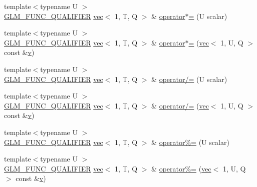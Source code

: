 \begin{DoxyCompactItemize}
\item 
{\footnotesize template$<$typename U $>$ }\\\hyperlink{setup_8hpp_a33fdea6f91c5f834105f7415e2a64407}{G\+L\+M\+\_\+\+F\+U\+N\+C\+\_\+\+Q\+U\+A\+L\+I\+F\+I\+ER} \hyperlink{structglm_1_1vec}{vec}$<$ 1, T, Q $>$ \& \hyperlink{structglm_1_1vec_3_011_00_01_t_00_01_q_01_4_a40577d349a0b2aa9cb5e8f516be56f5b}{operator$\ast$=} (U scalar)
\item 
{\footnotesize template$<$typename U $>$ }\\\hyperlink{setup_8hpp_a33fdea6f91c5f834105f7415e2a64407}{G\+L\+M\+\_\+\+F\+U\+N\+C\+\_\+\+Q\+U\+A\+L\+I\+F\+I\+ER} \hyperlink{structglm_1_1vec}{vec}$<$ 1, T, Q $>$ \& \hyperlink{structglm_1_1vec_3_011_00_01_t_00_01_q_01_4_ad99d855b46377ab71a047c3c62c41054}{operator$\ast$=} (\hyperlink{structglm_1_1vec}{vec}$<$ 1, U, Q $>$ const \&\hyperlink{_s_d_l__opengl_8h_a10a82eabcb59d2fcd74acee063775f90}{v})
\item 
{\footnotesize template$<$typename U $>$ }\\\hyperlink{setup_8hpp_a33fdea6f91c5f834105f7415e2a64407}{G\+L\+M\+\_\+\+F\+U\+N\+C\+\_\+\+Q\+U\+A\+L\+I\+F\+I\+ER} \hyperlink{structglm_1_1vec}{vec}$<$ 1, T, Q $>$ \& \hyperlink{structglm_1_1vec_3_011_00_01_t_00_01_q_01_4_a25bbfeb0e44bca9205cd7b127b566ba8}{operator/=} (U scalar)
\item 
{\footnotesize template$<$typename U $>$ }\\\hyperlink{setup_8hpp_a33fdea6f91c5f834105f7415e2a64407}{G\+L\+M\+\_\+\+F\+U\+N\+C\+\_\+\+Q\+U\+A\+L\+I\+F\+I\+ER} \hyperlink{structglm_1_1vec}{vec}$<$ 1, T, Q $>$ \& \hyperlink{structglm_1_1vec_3_011_00_01_t_00_01_q_01_4_a8bf658f58cfbd59ca4421fb0ba1b0eb5}{operator/=} (\hyperlink{structglm_1_1vec}{vec}$<$ 1, U, Q $>$ const \&\hyperlink{_s_d_l__opengl_8h_a10a82eabcb59d2fcd74acee063775f90}{v})
\item 
{\footnotesize template$<$typename U $>$ }\\\hyperlink{setup_8hpp_a33fdea6f91c5f834105f7415e2a64407}{G\+L\+M\+\_\+\+F\+U\+N\+C\+\_\+\+Q\+U\+A\+L\+I\+F\+I\+ER} \hyperlink{structglm_1_1vec}{vec}$<$ 1, T, Q $>$ \& \hyperlink{structglm_1_1vec_3_011_00_01_t_00_01_q_01_4_a41cf765caed386c25ead2b2420b61039}{operator\%=} (U scalar)
\item 
{\footnotesize template$<$typename U $>$ }\\\hyperlink{setup_8hpp_a33fdea6f91c5f834105f7415e2a64407}{G\+L\+M\+\_\+\+F\+U\+N\+C\+\_\+\+Q\+U\+A\+L\+I\+F\+I\+ER} \hyperlink{structglm_1_1vec}{vec}$<$ 1, T, Q $>$ \& \hyperlink{structglm_1_1vec_3_011_00_01_t_00_01_q_01_4_a78d638cf272b3293078df0aab1aedb67}{operator\%=} (\hyperlink{structglm_1_1vec}{vec}$<$ 1, U, Q $>$ const \&\hyperlink{_s_d_l__opengl_8h_a10a82eabcb59d2fcd74acee063775f90}{v})

\end{DoxyCompactItemize}
